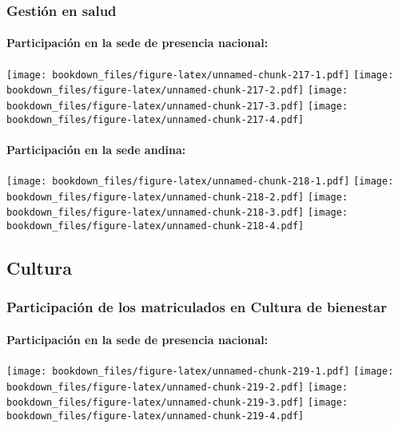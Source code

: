 \documentclass[]{article}
\let\oldparagraph\paragraph
\renewcommand{\paragraph}[1]{\oldparagraph{#1}\mbox{}}
\theoremstyle{definition}
\theoremstyle{definition}
\theoremstyle{definition}
\theoremstyle{remark}
\begin{document}
\subsubsection{Gestión en salud}\label{gestion-en-salud-1}

\paragraph{Participación en la sede de presencia
nacional:}\label{participacion-en-la-sede-de-presencia-nacional-21}

\texttt{[image: bookdown\_files/figure-latex/unnamed-chunk-217-1.pdf]}
\texttt{[image: bookdown\_files/figure-latex/unnamed-chunk-217-2.pdf]}
\texttt{[image: bookdown\_files/figure-latex/unnamed-chunk-217-3.pdf]}
\texttt{[image: bookdown\_files/figure-latex/unnamed-chunk-217-4.pdf]}

\paragraph{Participación en la sede
andina:}\label{participacion-en-la-sede-andina-21}

\texttt{[image: bookdown\_files/figure-latex/unnamed-chunk-218-1.pdf]}
\texttt{[image: bookdown\_files/figure-latex/unnamed-chunk-218-2.pdf]}
\texttt{[image: bookdown\_files/figure-latex/unnamed-chunk-218-3.pdf]}
\texttt{[image: bookdown\_files/figure-latex/unnamed-chunk-218-4.pdf]}

\subsection{Cultura}\label{cultura-1}

\subsubsection{Participación de los matriculados en Cultura de
bienestar}\label{participacion-de-los-matriculados-en-cultura-de-bienestar-1}

\paragraph{Participación en la sede de presencia
nacional:}\label{participacion-en-la-sede-de-presencia-nacional-22}

\texttt{[image: bookdown\_files/figure-latex/unnamed-chunk-219-1.pdf]}
\texttt{[image: bookdown\_files/figure-latex/unnamed-chunk-219-2.pdf]}
\texttt{[image: bookdown\_files/figure-latex/unnamed-chunk-219-3.pdf]}
\texttt{[image: bookdown\_files/figure-latex/unnamed-chunk-219-4.pdf]}
\end{document}

